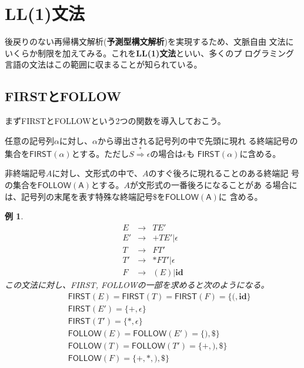 \documentclass[a4j,10pt]{jsarticle}
\newtheorem{example}{例}
\begin{document}
\section{LL(1)文法}

後戻りのない再帰構文解析(\textbf{予測型構文解析})を実現するため、文脈自由
文法にいくらか制限を加えてみる。これを\textbf{LL(1)文法}といい、多くのプ
ログラミング言語の文法はこの範囲に収まることが知られている。

\subsection{FIRSTとFOLLOW}

まず\textsf{FIRST}と\textsf{FOLLOW}という2つの関数を導入しておこう。

任意の記号列$\alpha$に対し、$\alpha$から導出される記号列の中で先頭に現れ
る終端記号の集合を$\mathsf{FIRST(\alpha)}$とする。ただし$S
\stackrel{*}{\Rightarrow} \epsilon$の場合は$\epsilon$も
$\mathsf{FIRST(\alpha)}$に含める。

非終端記号$A$に対し、文形式の中で、$A$のすぐ後ろに現れることのある終端記
号の集合を$\mathsf{FOLLOW(A)}$とする。$A$が文形式の一番後ろになることがあ
る場合には、記号列の末尾を表す特殊な終端記号$\$$を$\mathsf{FOLLOW(A)}$に
含める。

\begin{screen}
 \begin{example}\label{ex:first_follow}
  \begin{eqnarray*}
   E & \rightarrow & TE' \\
   E' & \rightarrow & + TE' | \epsilon \\
   T & \rightarrow & FT' \\
   T' & \rightarrow & * FT' | \epsilon \\
   F & \rightarrow & (E) | \mathbf{id}
  \end{eqnarray*}
  この文法に対し、\textsf{FIRST, FOLLOW}の一部を求めると次のようになる。
  \begin{eqnarray*}
   & & \mathsf{FIRST}(E) = \mathsf{FIRST}(T) = \mathsf{FIRST}(F) = \{(,
    \mathbf{id}\} \\
   & & \mathsf{FIRST}(E') = \{+, \epsilon\} \\
   & & \mathsf{FIRST}(T') = \{*, \epsilon\} \\
   & & \mathsf{FOLLOW}(E) = \mathsf{FOLLOW}(E') = \{), \$\} \\
   & & \mathsf{FOLLOW}(T) = \mathsf{FOLLOW}(T') = \{+, ), \$\} \\
   & & \mathsf{FOLLOW}(F) = \{+, *, ), \$\}
  \end{eqnarray*}
 \end{example}
\end{screen}
\end{document}
